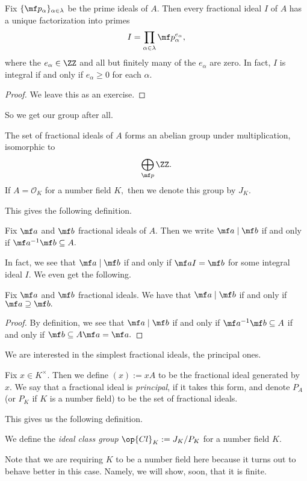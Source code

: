 \documentclass[../notes.tex]{subfiles}
\begin{document}
\begin{thm}
    Fix $\{\mf p_\alpha\}_{\alpha\in\lambda}$ be the prime ideals of $A.$ Then every fractional ideal $I$ of $A$ has a unique factorization into primes
    \[I=\prod_{\alpha\in\lambda}\mf p_\alpha^{e_\alpha},\]
    where the $e_\alpha\in\ZZ$ and all but finitely many of the $e_\alpha$ are zero. In fact, $I$ is integral if and only if $e_\alpha\ge0$ for each $\alpha.$
\end{thm}
\begin{proof}
    We leave this as an exercise.
\end{proof}
So we get our group after all.
\begin{thm}
    The set of fractional ideals of $A$ forms an abelian group under multiplication, isomorphic to
    \[\bigoplus_{\mf p}\ZZ.\]
    If $A=\mathcal O_K$ for a number field $K,$ then we denote this group by $J_K.$
\end{thm}
This gives the following definition.
\begin{defi}
    Fix $\mf a$ and $\mf b$ fractional ideals of $A.$ Then we write $\mf a\mid\mf b$ if and only if $\mf a^{-1}\mf b\subseteq A.$
\end{defi}
In fact, we see that $\mf a\mid\mf b$ if and only if $\mf aI=\mf b$ for some integral ideal $I.$ We even get the following.
\begin{lem}
    Fix $\mf a$ and $\mf b$ fractional ideals. We have that $\mf a\mid\mf b$ if and only if $\mf a\supseteq\mf b.$
\end{lem}
\begin{proof}
    By definition, we see that $\mf a\mid\mf b$ if and only if $\mf a^{-1}\mf b\subseteq A$ if and only if $\mf b\subseteq A\mf a=\mf a.$
\end{proof}
We are interested in the simplest fractional ideals, the principal ones.
\begin{defi}[Principal]
    Fix $x\in K^\times.$ Then we define $(x):=xA$ to be the fractional ideal generated by $x.$ We say that a fractional ideal is \textit{principal}, if it takes this form, and denote $P_A$ (or $P_K$ if $K$ is a number field) to be the set of fractional ideals.
\end{defi}
This gives us the following definition.
\begin{defi}
    We define the \textit{ideal class group} $\op{Cl}_K:=J_K/P_K$ for a number field $K.$
\end{defi}
Note that we are requiring $K$ to be a number field here because it turns out to behave better in this case. Namely, we will show, soon, that it is finite.
\end{document}
